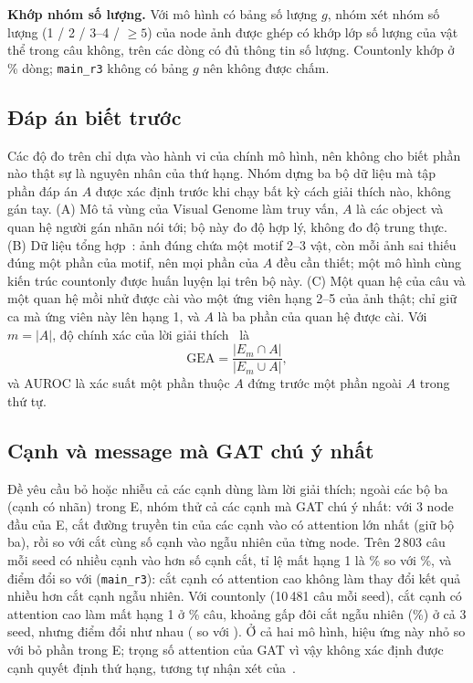 \textbf{Khớp nhóm số lượng.} Với mô hình có bảng số lượng $g$, nhóm xét nhóm số lượng (1 / 2 / 3--4 / $\ge5$) của node ảnh
được ghép có khớp lớp số lượng của vật thể trong câu không, trên các dòng có đủ thông tin số lượng. Countonly khớp ở
\% dòng; \texttt{main\_r3} không có bảng $g$ nên không được chấm.

\subsection{Đáp án biết trước}\label{sec:xai-gt}
Các độ đo trên chỉ dựa vào hành vi của chính mô hình, nên không cho biết phần nào thật sự là nguyên nhân của thứ hạng. Nhóm
dựng ba bộ dữ liệu mà tập phần đáp án $A$ được xác định trước khi chạy bất kỳ cách giải thích nào, không gán tay.
(A) Mô tả vùng của Visual Genome làm truy vấn, $A$ là các object và quan hệ người gán nhãn nói tới; bộ này đo độ hợp lý,
không đo độ trung thực.
(B) Dữ liệu tổng hợp~\cite{xai-faber2021groundtruth}: ảnh đúng chứa một motif 2--3 vật, còn mỗi ảnh sai thiếu đúng một phần
của motif, nên mọi phần của $A$ đều cần thiết; một mô hình cùng kiến trúc countonly được huấn luyện lại trên bộ này.
(C) Một quan hệ của câu và một quan hệ mồi nhử được cài vào một ứng viên hạng 2--5 của ảnh thật; chỉ giữ ca mà ứng viên này
lên hạng 1, và $A$ là ba phần của quan hệ được cài.
Với $m=|A|$, độ chính xác của lời giải thích~\cite{xai-agarwal2023graphxai} là
\begin{equation}
  \mathrm{GEA}=\frac{|E_m\cap A|}{|E_m\cup A|},
  \label{eq:gea}
\end{equation}
và AUROC là xác suất một phần thuộc $A$ đứng trước một phần ngoài $A$ trong thứ tự.

\subsection{Cạnh và message mà GAT chú ý nhất}\label{sec:xai-gat}
Đề yêu cầu bỏ hoặc nhiễu cả các cạnh dùng làm lời giải thích; ngoài các bộ ba (cạnh có
nhãn) trong E, nhóm thử cả các cạnh mà GAT chú ý nhất: với 3 node đầu của E, cắt đường truyền tin của các cạnh vào có
attention lớn nhất (giữ bộ ba), rồi so với cắt cùng số cạnh vào ngẫu nhiên của từng node. Trên 2\,803 câu mỗi seed có nhiều
cạnh vào hơn số cạnh cắt, tỉ lệ mất hạng 1 là \% so với \%, và điểm đổi
 so với  (\texttt{main\_r3}): cắt cạnh có attention cao không làm thay
đổi kết quả nhiều hơn cắt cạnh ngẫu nhiên. Với countonly (10\,481 câu mỗi seed), cắt cạnh có attention cao làm mất hạng 1 ở
\% câu, khoảng gấp đôi cắt ngẫu nhiên (\%) ở cả 3 seed, nhưng điểm đổi như nhau
( so với ). Ở cả hai mô hình, hiệu ứng này nhỏ so với bỏ phần trong E;
trọng số attention của GAT vì vậy không xác định được cạnh quyết định thứ hạng, tương tự nhận xét
của~\cite{xai-jain2019attention}.

